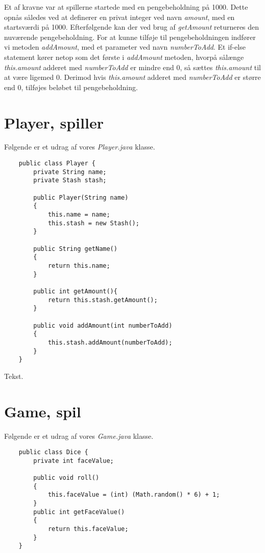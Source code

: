 \noindent Et af kravne var at spillerne startede med en pengebeholdning på 1000.
Dette opnås således ved at definerer en privat integer ved navn \textit{amount}, med en startsværdi på 1000.
Efterfølgende kan der ved brug af \textit{getAmount} returneres den nuværende pengebeholdning.
For at kunne tilføje til pengebeholdningen indfører vi metoden \textit{addAmount}, med et parameter ved navn \textit{numberToAdd}.
Et if-else statement kører netop som det første i \textit{addAmount} metoden, hvorpå sålænge \textit{this.amount} adderet med \textit{numberToAdd} er mindre end 0, så sættes \textit{this.amount} til at være ligemed 0.
Derimod hvis \textit{this.amount} adderet med \textit{numberToAdd} er større end 0, tilføjes beløbet til pengebeholdning.\\

\section{Player, spiller}
\noindent Følgende er et udrag af vores \textit{Player.java} klasse.\\
\begin{lstlisting}
    public class Player {
        private String name;
        private Stash stash;
    
        public Player(String name)
        {
            this.name = name;
            this.stash = new Stash();
        }
    
        public String getName()
        {
            return this.name;
        }
    
        public int getAmount(){
            return this.stash.getAmount();
        }
    
        public void addAmount(int numberToAdd)
        {
            this.stash.addAmount(numberToAdd);
        }
    }       
\end{lstlisting}
\vspace{2ex}

\noindent Tekst.\\

\section{Game, spil}
\noindent Følgende er et udrag af vores \textit{Game.java} klasse.\\
\begin{lstlisting}
    public class Dice {
        private int faceValue;

        public void roll()
        {
            this.faceValue = (int) (Math.random() * 6) + 1;
        }
        public int getFaceValue()
        {
            return this.faceValue;
        }
    }
\end{lstlisting}
\vspace{2ex}

